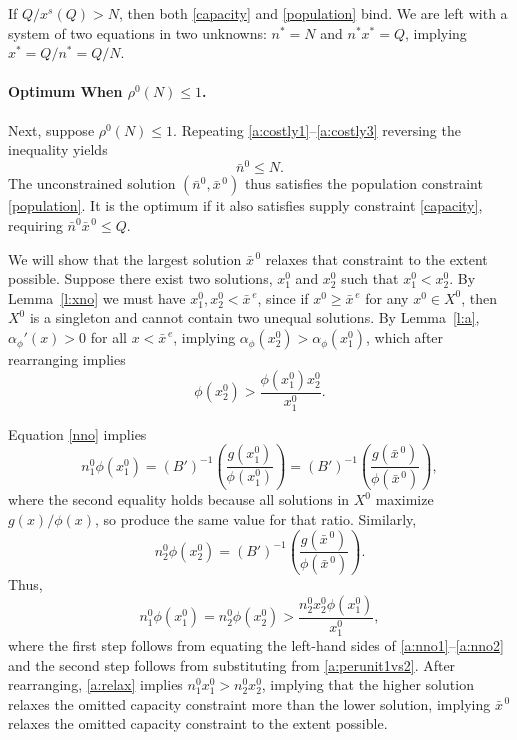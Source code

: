\documentclass[12pt]{article}
\newcommand{\efficacy}{\phi}
\newcommand{\general}{g}
\newcommand{\benefit}{B}
\newcommand{\ratio}{\rho^0\!}
\newcommand{\xshort}{x^{s}}
\newcommand{\xunitbar}{\bar{x}^{\,e}}
\newcommand{\xno}{x^{0}}
\newcommand{\Xno}{X^{0}}
\newcommand{\xnobar}{\bar{x}^{\,0}}
\newcommand{\nno}{n^{0}}
\newcommand{\nnobar}{\bar{n}^{0}}
\newcommand{\perunit}[1]{\alpha_{#1}}
\begin{document}
If $Q / \xshort\!(Q) > N$, then both \eqref{capacity} and
\eqref{population} bind. We are left with a system of two equations in
two unknowns: $n^* = N$ and $n^* x^* = Q$, implying $x^* = Q / n^* =
Q/N$.

\paragraph{Optimum When $\ratio(N) \leq 1$.}

Next, suppose $\ratio(N) \leq 1$. Repeating
\eqref{a:costly1}--\eqref{a:costly3} reversing the inequality yields
\begin{equation}
\label{a:nulN}
\nnobar \leq N.
\end{equation} 
The unconstrained solution $(\nnobar, \xnobar)$ thus satisfies the
population constraint \eqref{population}. It is the optimum if it also
satisfies supply constraint \eqref{capacity}, requiring $\nnobar \xnobar
\leq Q$.

We will show that the largest solution $\xnobar$ relaxes that
constraint to the extent possible. Suppose there exist two solutions,
$\xno_1$ and $\xno_2$ such that $\xno_1 < \xno_2$. By
Lemma~\ref{l:xno} we must have $\xno_1, \xno_2 < \xunitbar$, since if
$\xno \geq \xunitbar$ for any $\xno \in \Xno$, then $\Xno$ is a
singleton and cannot contain two unequal solutions. By
Lemma~\ref{l:a}, $\perunit{\efficacy}'\!(x) > 0$ for all $x <
\xunitbar$, implying $\perunit{\efficacy}\!(\xno_2) >
\perunit{\efficacy}\!(\xno_1)$, which after rearranging implies
\begin{equation}
\label{a:perunit1vs2}
\efficacy(\xno_2) > \frac{\efficacy(\xno_1) \xno_2}{\xno_1}. 
\end{equation}

Equation \eqref{nno} implies
\begin{equation}
\label{a:nno1}
\nno_1 \efficacy(\xno_1) = (\benefit')^{-1} \! \left(
\frac{\general(\xno_1)}{\efficacy(\xno_1)} \right) = (\benefit')^{-1} \!
\left( \frac{\general(\xnobar)}{\efficacy(\xnobar)} \right),
\end{equation}
where the second equality holds because all solutions in $\Xno$
maximize $\general(x) / \efficacy(x)$, so produce the same value for
that ratio. Similarly,
\begin{equation}
\label{a:nno2}
\nno_2 \efficacy(\xno_2) = (\benefit')^{-1} \! \left(
\frac{\general(\xnobar)}{\efficacy(\xnobar)} \right).
\end{equation}
Thus,
\begin{equation}
\label{a:relax}
\nno_1 \efficacy(\xno_1) = \nno_2 \efficacy(\xno_2) > \frac{\nno_2 \xno_2 \efficacy(\xno_1)}{\xno_1},  
\end{equation}
where the first step follows from equating the left-hand sides of
\eqref{a:nno1}--\eqref{a:nno2} and the second step follows from
substituting from \eqref{a:perunit1vs2}. After rearranging,
\eqref{a:relax} implies $\nno_1 \xno_1 > \nno_2
\xno_2$, implying that the higher solution relaxes the omitted
capacity constraint more than the lower solution, implying $\xnobar$
relaxes the omitted capacity constraint to the extent possible.
\end{document}
